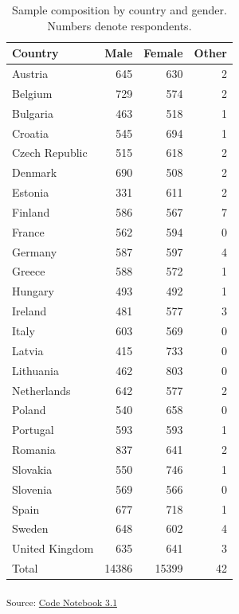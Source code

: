 \documentclass[
  12pt,
  a4paper,
  DIV=11,
  numbers=noendperiod]{scrartcl}
\begin{document}
\begin{longtable}[]{@{}lrrr@{}}

\caption{\label{tbl-nresp-country-gender}Sample composition by country
and gender. Numbers denote respondents.}

\tabularnewline

\toprule\noalign{}
Country & Male & Female & Other \\
\midrule\noalign{}
\endhead
\bottomrule\noalign{}
\endlastfoot
Austria & 645 & 630 & 2 \\
Belgium & 729 & 574 & 2 \\
Bulgaria & 463 & 518 & 1 \\
Croatia & 545 & 694 & 1 \\
Czech Republic & 515 & 618 & 2 \\
Denmark & 690 & 508 & 2 \\
Estonia & 331 & 611 & 2 \\
Finland & 586 & 567 & 7 \\
France & 562 & 594 & 0 \\
Germany & 587 & 597 & 4 \\
Greece & 588 & 572 & 1 \\
Hungary & 493 & 492 & 1 \\
Ireland & 481 & 577 & 3 \\
Italy & 603 & 569 & 0 \\
Latvia & 415 & 733 & 0 \\
Lithuania & 462 & 803 & 0 \\
Netherlands & 642 & 577 & 2 \\
Poland & 540 & 658 & 0 \\
Portugal & 593 & 593 & 1 \\
Romania & 837 & 641 & 2 \\
Slovakia & 550 & 746 & 1 \\
Slovenia & 569 & 566 & 0 \\
Spain & 677 & 718 & 1 \\
Sweden & 648 & 602 & 4 \\
United Kingdom & 635 & 641 & 3 \\
Total & 14386 & 15399 & 42 \\

\end{longtable}

\textsubscript{Source:
\href{https://LS-Konig.github.io/CSAP/code/03_explanal/3.1_descr_anal-preview.html\#cell-tbl-nresp-country-gender}{Code
Notebook 3.1}}
\end{document}
